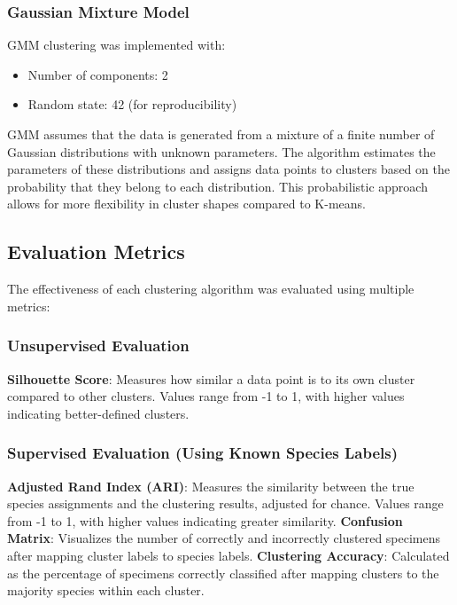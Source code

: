 \documentclass[a4paper,12pt]{report}
\begin{document}
\subsubsection{Gaussian Mixture Model}
GMM clustering was implemented with:
\begin{itemize}
    \item Number of components: 2
    \item Random state: 42 (for reproducibility)
\end{itemize}
GMM assumes that the data is generated from a mixture of a finite number of Gaussian distributions with unknown parameters.  The algorithm estimates the parameters of these distributions and assigns data points to clusters based on the probability that they belong to each distribution. This probabilistic approach allows for more flexibility in cluster shapes compared to K-means.

\subsection{Evaluation Metrics}
The effectiveness of each clustering algorithm was evaluated using multiple metrics:

\subsubsection{Unsupervised Evaluation}
\textbf{Silhouette Score}: Measures how similar a data point is to its own cluster compared to other clusters. Values range from -1 to 1, with higher values indicating better-defined clusters.

\subsubsection{Supervised Evaluation (Using Known Species Labels)}
\textbf{Adjusted Rand Index (ARI)}: Measures the similarity between the true species assignments and the clustering results, adjusted for chance. Values range from -1 to 1, with higher values indicating greater similarity.
\textbf{Confusion Matrix}: Visualizes the number of correctly and incorrectly clustered specimens after mapping cluster labels to species labels.
\textbf{Clustering Accuracy}: Calculated as the percentage of specimens correctly classified after mapping clusters to the majority species within each cluster.
\end{document}
